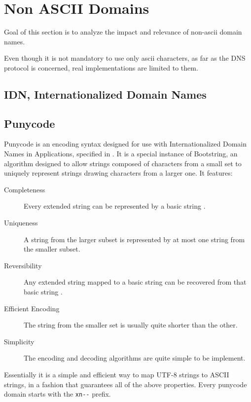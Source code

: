 \section{Non ASCII Domains}
\label{sec:non_ascii_domains}
Goal of this section is to analyze the impact and relevance of non-ascii domain names.

Even though it is not mandatory to use only ascii characters, as far as the DNS protocol is
concerned, real implementations are limited to them.


\subsection{IDN, Internationalized Domain Names} %
\label{sub:idn_internationalized_domain_names}



\subsection{Punycode} %
\label{sub:punycode}
Punycode is an encoding syntax designed for use with Internationalized Domain Names in
Applications, specified in \cite{idna_protocol}. It is a special instance of Bootstring,
an algorithm designed to allow strings composed of characters from a small set to uniquely
represent strings drawing characters from a larger one. It features:
\begin{description}
  \item[Completeness] Every extended string can be represented by a basic string
    \cite{idna_protocol}.
  \item[Uniqueness] A string from the larger subset is represented by at most one string
    from the smaller subset.
  \item[Reversibility] Any extended string mapped to a basic string can be recovered from
    that basic string \cite{idna_protocol}.
  \item[Efficient Encoding] The string from the smaller set is usually quite shorter than the
    other.
  \item[Simplicity] The encoding and decoding algorithms are quite simple to be implement.
\end{description}

Essentially it is a simple and efficient way to map UTF-8 strings to ASCII strings, in a fashion
that guarantees all of the above properties. Every punycode domain starts with the \verb+xn--+
prefix.



